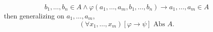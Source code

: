 $$b_1, \ldots, b_n \in A \wedge \varphi(a_1, \ldots, a_m, b_1, \ldots, b_n) \rightarrow a_1, \ldots, a_m \in A$$
then generalizing on $a_1, \ldots, a_m$,
$$(\forall x_1, \ldots, x_m)[\varphi \rightarrow \psi] \text{ Abs } A.$$
